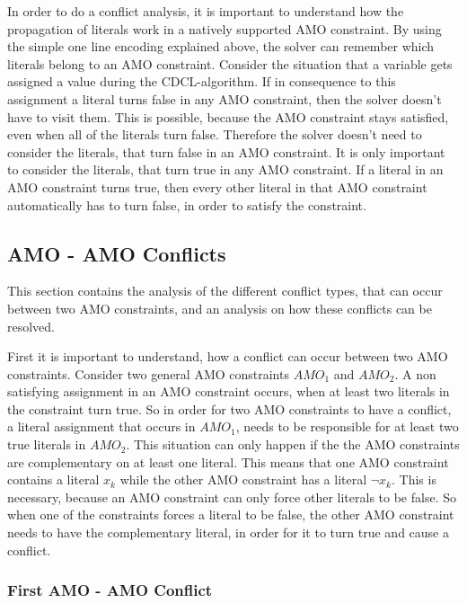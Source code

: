 In order to do a conflict analysis, it is important to understand how the propagation of literals work in a natively supported AMO constraint. By using the simple one line encoding explained above, the solver can remember which literals belong to an AMO constraint. Consider the situation that a variable gets assigned a value during the CDCL-algorithm. If in consequence to this assignment a literal turns false in any AMO constraint, then the solver doesn’t have to visit them. This is possible, because the AMO constraint stays satisfied, even when all of the literals turn false. Therefore the solver doesn't need to consider the literals, that turn false in an AMO constraint. It is only important to consider the literals, that turn true in any AMO constraint. If a literal in an AMO constraint turns true, then every other literal in that AMO constraint automatically has to turn false, in order to satisfy the constraint.

\subsection{AMO - AMO Conflicts}

This section contains the analysis of the different conflict types, that can occur between two AMO constraints, and an analysis on how these conflicts can be resolved.


First it is important to understand, how a conflict can occur between two AMO constraints. Consider two general AMO constraints $AMO_1$ and $AMO_2$. A non satisfying assignment in an AMO constraint occurs, when at least two literals in the constraint turn true. So in order for two AMO constraints to have a conflict, a literal assignment that occurs in $AMO_1$, needs to be responsible for at least two true literals in $AMO_2$. This situation can only happen if the the AMO constraints are complementary on at least one literal. This means that one AMO constraint contains a literal $x_k$ while the other AMO constraint has a literal $\neg x_k$. This is necessary, because an AMO constraint can only force other literals to be false. So when one of the constraints forces a literal to be false, the other AMO constraint needs to have the complementary literal, in order for it to turn true and cause a conflict.

\subsubsection{First AMO - AMO Conflict}

